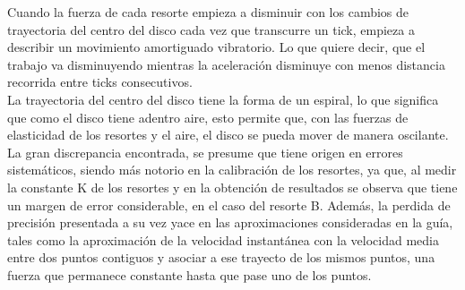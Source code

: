 \documentclass[../main.tex]{subfiles}
\begin{document}
Cuando la fuerza de cada resorte empieza a disminuir con los cambios de trayectoria del centro del disco cada vez que transcurre un tick, empieza a describir un movimiento amortiguado vibratorio. Lo que quiere decir, que el trabajo va disminuyendo mientras la aceleración disminuye con menos distancia recorrida entre ticks consecutivos.\\
La trayectoria del centro del disco tiene la forma de un espiral, lo que significa que como el disco tiene adentro aire, esto permite que, con las fuerzas de elasticidad de los resortes y el aire, el disco se pueda mover de manera oscilante. \\
La gran discrepancia encontrada, se presume que tiene origen en errores sistemáticos, siendo más notorio en la calibración de los resortes, ya que, al medir la constante K de los resortes y en la obtención de resultados se observa que tiene un margen de error considerable, en el caso del resorte B. Además, la perdida de precisión presentada a su vez yace en las aproximaciones consideradas en la guía, tales como la aproximación de la velocidad instantánea con la velocidad media entre dos puntos contiguos y asociar a ese trayecto de los mismos puntos, una fuerza que permanece constante hasta que pase uno de los puntos. \\
\end{document}
